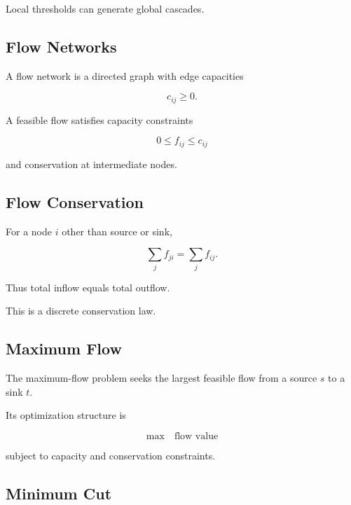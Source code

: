 Local thresholds can generate global cascades.

\subsection{Flow Networks}
\label{subsec:network-flow-networks}

A flow network is a directed graph with edge capacities

\[
\boxed{
c_{ij}\geq0.
}
\]

A feasible flow satisfies capacity constraints

\[
\boxed{
0\leq f_{ij}\leq c_{ij}
}
\]

and conservation at intermediate nodes.

\subsection{Flow Conservation}
\label{subsec:network-flow-conservation}

For a node \(i\) other than source or sink,

\[
\boxed{
\sum_jf_{ji}
=
\sum_jf_{ij}.
}
\]

Thus total inflow equals total outflow.

This is a discrete conservation law.

\subsection{Maximum Flow}
\label{subsec:network-maximum-flow}

The maximum-flow problem seeks the largest feasible flow from a source \(s\)
to a sink \(t\).

Its optimization structure is

\[
\boxed{
\max
\quad
\text{flow value}
}
\]

subject to capacity and conservation constraints.

\subsection{Minimum Cut}
\label{subsec:network-minimum-cut}

